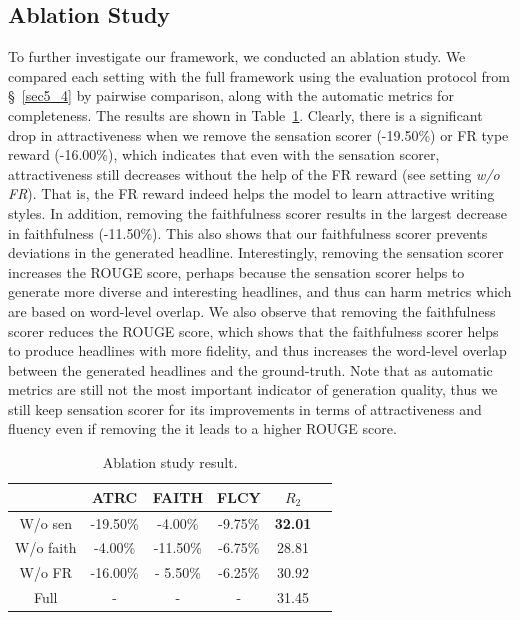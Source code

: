 \subsection{Ablation Study}
To further investigate our framework, we conducted an ablation study. 
We compared each setting with the full framework using the evaluation protocol
from \S~\ref{sec5_4} by pairwise comparison, along with the automatic metrics
for completeness. 
The results are shown in Table~\ref{ablation}. 
Clearly, there is a significant drop in attractiveness when we remove the
sensation scorer (-19.50\%) or FR type reward (-16.00\%), which indicates that
even with the sensation scorer, attractiveness still decreases without the help
of the FR reward (see setting \emph{w/o FR}). That is, the FR reward indeed
helps the model to learn attractive writing styles. 
In addition, removing the faithfulness scorer results in the largest decrease in
faithfulness (-11.50\%). This also shows that our faithfulness
scorer prevents deviations in the generated headline. Interestingly, removing
the sensation scorer increases the ROUGE score, perhaps because the
sensation scorer helps to generate more diverse and interesting headlines, and thus
can harm metrics which are based on word-level overlap. We also observe that
removing the faithfulness scorer reduces the ROUGE score, which shows that
the faithfulness scorer helps to produce headlines with more fidelity, and
thus increases the word-level overlap between the generated headlines and the 
ground-truth.
Note that as automatic metrics are still not the most important indicator of
generation quality, thus we still keep sensation scorer for its improvements in terms of attractiveness and
fluency even if removing the it leads to a higher
ROUGE score.

\begin{table}[!h]
\centering
\small
\begin{tabular}{ cccccc }
\bottomrule
 & ATRC & FAITH & FLCY & $R_2$ & \\
\hline
W/o sen   & -19.50\% &   -4.00\%  & -9.75\% & \textbf{32.01} \\
W/o faith &  -4.00\% &	-11.50\%  & -6.75\% & 28.81 \\
W/o FR    & -16.00\% &  - 5.50\%  & -6.25\% & 30.92 \\
Full      &   -      &     -      &    -    & 31.45 \\
\toprule
\end{tabular}
\caption{\label{ablation}
Ablation study result. 
}
\end{table}


